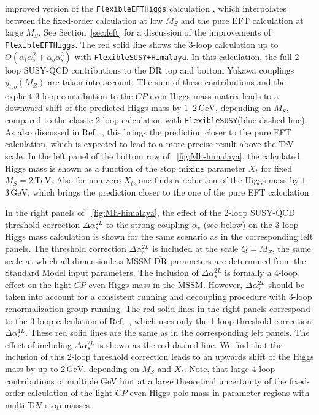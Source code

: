 \documentclass[final,3p,11pt,pdflatex]{elsarticle}
\makeatletter
\newcommand{\fs}{\texttt{FlexibleSUSY}\@\xspace}
\newcommand{\Himalaya}{\texttt{Himalaya}\@\xspace}
\newcommand{\fsh}{\texttt{FlexibleSUSY+}\Himalaya\xspace}
\newcommand{\feft}{\texttt{Flex\-ib\-le\-EFT\-Higgs}\@\xspace}
\newcommand{\ol}[1]{\overline{#1}}
\newcommand{\DRbar}{\ensuremath{\ol{\text{DR}}}\xspace}
\newcommand{\unit}[1]{\,\text{#1}}      %
\newcommand{\MS}{\ensuremath{M_S}\xspace}
\newcommand{\figref}[1]{\figurename~\ref{#1}}
\newcommand{\secref}[1]{Section~\ref{#1}}
\newcommand{\CP}{\ensuremath{CP}\xspace}
\newcommand{\SQCD}{SUSY-QCD\xspace}
\def\at{\alpha_t}
\def\ab{\alpha_b}
\def\as{\alpha_s}
\makeatother
\begin{document}
improved version of the \feft calculation \cite{Athron:2016fuq}, which
interpolates
between the fixed-order calculation at low \MS and the pure EFT
calculation at large \MS.  See \secref{sec:feft} for a discussion of
the improvements of \feft.  The red solid line shows the 3-loop
calculation up to $O(\at\as^2 +
\ab\as^2)$ with \fsh \cite{Harlander:2017kuc}.  In this calculation, the
full 2-loop \SQCD contributions to the \DRbar top and bottom Yukawa
couplings $y_{t,b}(M_Z)$ \cite{Bednyakov:2007vm,Bednyakov:2002sf,Bednyakov:2005kt}
are taken into account.  The sum of these contributions
and the explicit 3-loop contribution to the \CP-even
Higgs mass matrix leads to a downward shift of the predicted Higgs
mass by $1$--$2\unit{GeV}$, depending on \MS, compared to the classic 2-loop
calculation with \fs (blue dashed line).  As also discussed in
Ref.~\cite{Harlander:2017kuc}, this brings the prediction closer to the pure
EFT calculation, which is expected to lead to a more precise result above
the TeV scale.  In the left panel of the bottom row of
\figref{fig:Mh-himalaya}, the calculated Higgs mass is shown as a
function of the stop mixing parameter $X_t$ for fixed
$\MS = 2\unit{TeV}$.  Also for non-zero
$X_t$, one finds a reduction of the Higgs mass by
$1$--$3\unit{GeV}$, which brings the prediction closer to the one of
the pure EFT calculation.

In the right panels of \figref{fig:Mh-himalaya}, the effect of the 2-loop
\SQCD threshold correction $\Delta\as^{2L}$
\cite{Harlander:2005wm,Bauer:2008bj,Bednyakov:2010ni} to the strong
coupling $\as$ (see below) on the 3-loop Higgs mass calculation is shown for
the same scenario as in the corresponding left panels.
The threshold correction $\Delta\as^{2L}$ is included at the scale
$Q = M_Z$, the same scale at which all dimensionless MSSM \DRbar
parameters are determined from the Standard Model input parameters.
The inclusion of $\Delta\as^{2L}$ is formally a 4-loop effect on the light
\CP-even Higgs mass in the MSSM\@.  However, $\Delta\as^{2L}$ should
be taken into account for a consistent running and decoupling
procedure with 3-loop renormalization group running.  The red solid
lines in the right panels correspond to the 3-loop calculation of
Ref.~\cite{Harlander:2017kuc}, which uses only the 1-loop threshold correction
$\Delta\as^{1L}$.  These red solid lines are the same as in the
corresponding left panels.  The effect of including
$\Delta\as^{2L}$ is shown as the red dashed line.  We find that the
inclusion of this 2-loop threshold correction leads to an upwards
shift of the Higgs mass by up to $2\unit{GeV}$, depending on \MS and
$X_t$.  Note, that large 4-loop contributions of multiple GeV hint at
a large theoretical uncertainty of the fixed-order calculation of the
light \CP-even Higgs pole mass in parameter regions with multi-TeV
stop masses.
\end{document}

